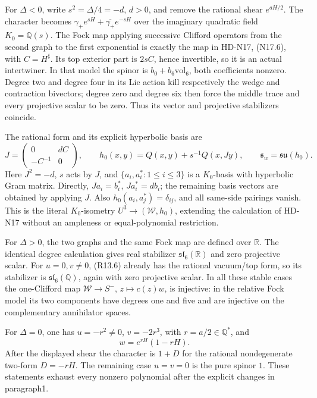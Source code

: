 For \(\Delta<0\), write \(s^2=\Delta/4=-d\),
\(d>0\), and remove the rational shear \(e^{aH/2}\).
The character becomes
\(\gamma_+e^{sH}+\overline{\gamma_+}e^{-sH}\) over the
imaginary quadratic field \(K_0=\mathbb Q(s)\).
The Fock map applying successive Clifford operators from the
second graph to the first exponential is exactly the map
in HD-N17, (N17.6), with \(C=H^\sharp\).
Its top exterior part is \(2sC\), hence invertible, so it
is an actual intertwiner. In that model the spinor is
\(b_0+b_6\mathrm{vol}_6\), both coefficients nonzero.
Degree two and degree four in its Lie action kill respectively
the wedge and contraction bivectors; degree zero and degree six
then force the middle trace and every projective scalar to be
zero. Thus its vector and projective stabilizers coincide.

The rational form and its explicit hyperbolic basis are
\[
 J=\begin{pmatrix}0&dC\\-C^{-1}&0\end{pmatrix},\qquad
 h_0(x,y)=Q(x,y)+s^{-1}Q(x,Jy),\qquad
                         \mathfrak s_w=\mathfrak{su}(h_0).
                                                               \tag{R13.8}
\]
Here \(J^2=-d\), \(s\) acts by \(J\), and
\(\{a_i,a_i^*:1\le i\le3\}\) is a \(K_0\)-basis
with hyperbolic Gram matrix. Directly,
\(Ja_i=b_i^*\), \(Ja_i^*=d b_i\); the remaining
basis vectors are obtained by applying \(J\).
Also \(h_0(a_i,a_j^*)=\delta_{ij}\), and all same-side
pairings vanish. This is the literal \(K_0\)-isometry
\(U^3\to(\mathcal W,h_0)\), extending the calculation of
HD-N17 without an ampleness or equal-polynomial restriction.

For \(\Delta>0\), the two graphs and the same Fock map
are defined over \(\mathbb R\). The identical degree
calculation gives real stabilizer \(\mathfrak{sl}_6(\mathbb R)\)
and zero projective scalar. For \(u=0,v\ne0\), (R13.6)
already has the rational vacuum/top form, so its stabilizer
is \(\mathfrak{sl}_6(\mathbb Q)\), again with zero
projective scalar. In all these stable cases the one-Clifford
map \(\mathcal W\to S^-\), \(z\mapsto c(z)w\), is
injective: in the relative Fock model its two components have
degrees one and five and are injective on the complementary
annihilator spaces.

For \(\Delta=0\), one has \(u=-r^2\ne0\),
\(v=-2r^3\), with \(r=a/2\in\mathbb Q^*\), and
\[
                         w=e^{rH}(1-rH).                    \tag{R13.9}
\]
After the displayed shear the character is \(1+D\) for
the rational nondegenerate two-form \(D=-rH\).
The remaining case \(u=v=0\) is the pure spinor \(1\).
These statements exhaust every nonzero polynomial after the
explicit changes in paragraph1.

